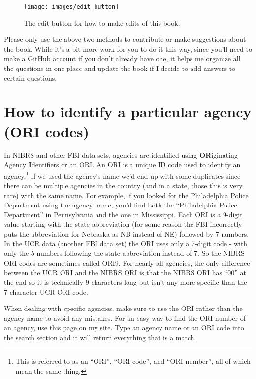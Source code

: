 \documentclass[
  12pt,
  openany]{book}
\begin{document}
\begin{figure}

{\centering \texttt{[image: images/edit\_button]} 

}

\caption{The edit button for how to make edits of this book.}\label{fig:unnamed-chunk-3}
\end{figure}

Please only use the above two methods to contribute or make suggestions about the book. While it's a bit more work for you to do it this way, since you'll need to make a GitHub account if you don't already have one, it helps me organize all the questions in one place and update the book if I decide to add answers to certain questions.

\section{How to identify a particular agency (ORI codes)}\label{ori}

In NIBRS and other FBI data sets, agencies are identified using \textbf{OR}iginating Agency \textbf{I}dentifiers or an ORI. An ORI is a unique ID code used to identify an agency.\footnote{This is referred to as an ``ORI'', ``ORI code'', and ``ORI number'', all of which mean the same thing.} If we used the agency's name we'd end up with some duplicates since there can be multiple agencies in the country (and in a state, those this is very rare) with the same name. For example, if you looked for the Philadelphia Police Department using the agency name, you'd find both the ``Philadelphia Police Department'' in Pennsylvania and the one in Mississippi. Each ORI is a 9-digit value starting with the state abbreviation (for some reason the FBI incorrectly puts the abbreviation for Nebraska as NB instead of NE) followed by 7 numbers. In the UCR data (another FBI data set) the ORI uses only a 7-digit code - with only the 5 numbers following the state abbreviation instead of 7. So the NIBRS ORI codes are sometimes called ORI9. For nearly all agencies, the only difference between the UCR ORI and the NIBRS ORI is that the NIBRS ORI has ``00'' at the end so it is technically 9 characters long but isn't any more specific than the 7-character UCR ORI code.

When dealing with specific agencies, make sure to use the ORI rather than the agency name to avoid any mistakes. For an easy way to find the ORI number of an agency, use \href{https://crimedatatool.com/crosswalk.html}{this page} on my site. Type an agency name or an ORI code into the search section and it will return everything that is a match.
\end{document}
